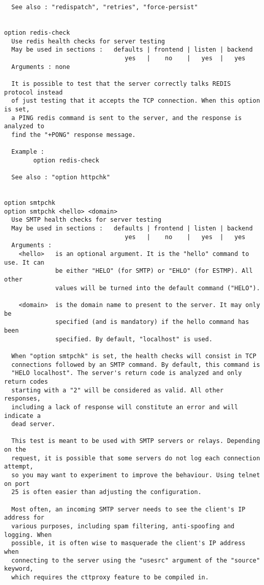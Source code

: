 \begin{verbatim}
  See also : "redispatch", "retries", "force-persist"


option redis-check
  Use redis health checks for server testing
  May be used in sections :   defaults | frontend | listen | backend
                                 yes   |    no    |   yes  |   yes
  Arguments : none

  It is possible to test that the server correctly talks REDIS protocol instead
  of just testing that it accepts the TCP connection. When this option is set,
  a PING redis command is sent to the server, and the response is analyzed to
  find the "+PONG" response message.

  Example :
        option redis-check

  See also : "option httpchk"


option smtpchk
option smtpchk <hello> <domain>
  Use SMTP health checks for server testing
  May be used in sections :   defaults | frontend | listen | backend
                                 yes   |    no    |   yes  |   yes
  Arguments :
    <hello>   is an optional argument. It is the "hello" command to use. It can
              be either "HELO" (for SMTP) or "EHLO" (for ESTMP). All other
              values will be turned into the default command ("HELO").

    <domain>  is the domain name to present to the server. It may only be
              specified (and is mandatory) if the hello command has been
              specified. By default, "localhost" is used.

  When "option smtpchk" is set, the health checks will consist in TCP
  connections followed by an SMTP command. By default, this command is
  "HELO localhost". The server's return code is analyzed and only return codes
  starting with a "2" will be considered as valid. All other responses,
  including a lack of response will constitute an error and will indicate a
  dead server.

  This test is meant to be used with SMTP servers or relays. Depending on the
  request, it is possible that some servers do not log each connection attempt,
  so you may want to experiment to improve the behaviour. Using telnet on port
  25 is often easier than adjusting the configuration.

  Most often, an incoming SMTP server needs to see the client's IP address for
  various purposes, including spam filtering, anti-spoofing and logging. When
  possible, it is often wise to masquerade the client's IP address when
  connecting to the server using the "usesrc" argument of the "source" keyword,
  which requires the cttproxy feature to be compiled in.


\end{verbatim}

